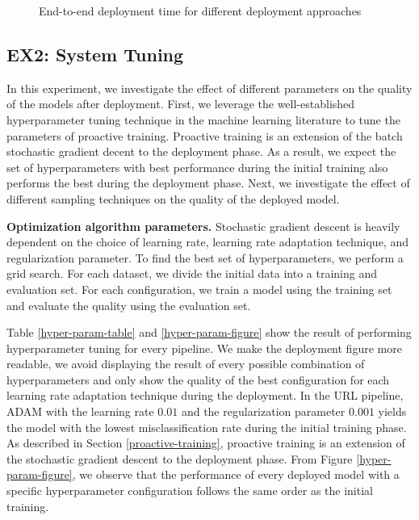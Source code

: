 \begin{figure}[h!]
\centering
\resizebox{\columnwidth}{!}{}
\caption{End-to-end deployment time for different deployment approaches}
\label{deployment-time-figure}
\end{figure}

\subsection{EX2: System Tuning}
In this experiment, we investigate the effect of different parameters on the quality of the models after deployment.
First, we leverage the well-established hyperparameter tuning technique in the machine learning literature to tune the parameters of proactive training.
Proactive training is an extension of the batch stochastic gradient decent to the deployment phase.
As a result, we expect the set of hyperparameters with best performance during the initial training also performs the best during the deployment phase.
Next, we investigate the effect of different sampling techniques on the quality of the deployed model.

\textbf{Optimization algorithm parameters. }
Stochastic gradient descent is heavily dependent on the choice of learning rate, learning rate adaptation technique, and regularization parameter.
To find the best set of hyperparameters, we perform a grid search.
For each dataset, we divide the initial data into a training and evaluation set.
For each configuration, we train a model using the training set and evaluate the quality using the evaluation set.

Table \ref{hyper-param-table} and \ref{hyper-param-figure} show the result of performing hyperparameter tuning for every pipeline.
We make the deployment figure more readable, we avoid displaying the result of every possible combination of hyperparameters and only show the quality of the best configuration for each learning rate adaptation technique during the deployment.
In the URL pipeline, ADAM with the learning rate $0.01$ and the regularization parameter $0.001$ yields the model with the lowest misclassification rate during the initial training phase.
As described in Section \ref{proactive-training}, proactive training is an extension of the stochastic gradient descent to the deployment phase.
From Figure \ref{hyper-param-figure}, we observe that the performance of every deployed model with a specific hyperparameter configuration follows the same order as the initial training.

